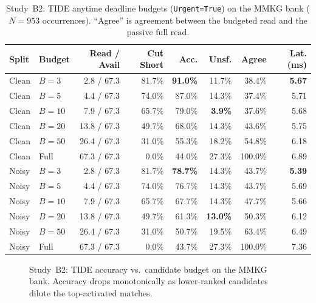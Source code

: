 \documentclass[12pt,a4paper,oneside]{report}
\newcommand{\code}[1]{\texttt{\small #1}}
\begin{document}
\begin{table}[H]
\centering
\caption{Study~B2: TIDE anytime deadline budgets (\code{Urgent=True}) on the MMKG bank ($N=953$ occurrences). ``Agree'' is agreement between the budgeted read and the passive full read.}
\label{tab:mmkg-anytime}
\small
\setlength{\tabcolsep}{4.2pt}
\begin{tabular}{@{}ll rrrrrr@{}}
\toprule
Split & Budget & Read / Avail & Cut Short & Acc. & Unsf. & Agree & Lat. (ms)\\
\midrule
Clean & $B=3$ & 2.8 / 67.3 & 81.7\% & \textbf{91.0\%} & 11.7\% & 38.4\% & \textbf{5.67}\\
Clean & $B=5$ & 4.4 / 67.3 & 74.0\% & 87.0\% & 14.3\% & 37.4\% & 5.71\\
Clean & $B=10$ & 7.9 / 67.3 & 65.7\% & 79.0\% & \textbf{3.9\%} & 37.6\% & 5.68\\
Clean & $B=20$ & 13.8 / 67.3 & 49.7\% & 68.0\% & 14.3\% & 43.6\% & 5.75\\
Clean & $B=50$ & 26.4 / 67.3 & 31.0\% & 55.3\% & 18.2\% & 54.8\% & 6.18\\
Clean & Full & 67.3 / 67.3 & 0.0\% & 44.0\% & 27.3\% & 100.0\% & 6.89\\
\midrule
Noisy & $B=3$ & 2.8 / 67.3 & 81.7\% & \textbf{78.7\%} & 14.3\% & 43.7\% & \textbf{5.39}\\
Noisy & $B=5$ & 4.4 / 67.3 & 74.0\% & 76.7\% & 14.3\% & 43.7\% & 5.69\\
Noisy & $B=10$ & 7.9 / 67.3 & 65.7\% & 67.7\% & 14.3\% & 47.7\% & 5.66\\
Noisy & $B=20$ & 13.8 / 67.3 & 49.7\% & 61.3\% & \textbf{13.0\%} & 50.3\% & 6.12\\
Noisy & $B=50$ & 26.4 / 67.3 & 31.0\% & 50.7\% & 19.5\% & 63.4\% & 6.49\\
Noisy & Full & 67.3 / 67.3 & 0.0\% & 43.7\% & 27.3\% & 100.0\% & 7.36\\
\bottomrule
\end{tabular}
\end{table}

\begin{figure}[H]
\centering
{}
\caption{Study~B2: TIDE accuracy vs.\ candidate budget on the MMKG bank. Accuracy drops monotonically as lower-ranked candidates dilute the top-activated matches.}
\label{fig:mmkg-tide}
\end{figure}
\end{document}

